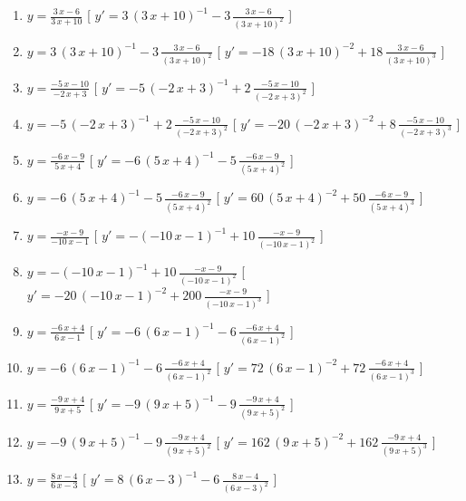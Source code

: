 \begin{esercizio}
\begin{enumerate}
\item $y= {\frac {3\,x-6}{3\,x+10}} $ \hfill [ $y'= 3\, \left( 3\,x+10 \right) ^{-1}-3\,{\frac {3\,x-6}{ \left( 3\,x+10 \right) ^{2}}}$ ]
\item $y= 3\, \left( 3\,x+10 \right) ^{-1}-3\,{\frac {3\,x-6}{ \left( 3\,x+10 \right) ^{2}}} $ \hfill [ $y'= -18\, \left( 3\,x+10 \right) ^{-2}+18\,{\frac {3\,x-6}{ \left( 3\,x+10 \right) ^{3}}}$ ]
\item $y= {\frac {-5\,x-10}{-2\,x+3}} $ \hfill [ $y'= -5\, \left( -2\,x+3 \right) ^{-1}+2\,{\frac {-5\,x-10}{ \left( -2\,x+3 \right) ^{2}}}$ ]
\item $y= -5\, \left( -2\,x+3 \right) ^{-1}+2\,{\frac {-5\,x-10}{ \left( -2\,x+3 \right) ^{2}}} $ \hfill [ $y'= -20\, \left( -2\,x+3 \right) ^{-2}+8\,{\frac {-5\,x-10}{ \left( -2\,x+3 \right) ^{3}}}$ ]
\item $y= {\frac {-6\,x-9}{5\,x+4}} $ \hfill [ $y'= -6\, \left( 5\,x+4 \right) ^{-1}-5\,{\frac {-6\,x-9}{ \left( 5\,x+4 \right) ^{2}}}$ ]
\item $y= -6\, \left( 5\,x+4 \right) ^{-1}-5\,{\frac {-6\,x-9}{ \left( 5\,x+4 \right) ^{2}}} $ \hfill [ $y'= 60\, \left( 5\,x+4 \right) ^{-2}+50\,{\frac {-6\,x-9}{ \left( 5\,x+4 \right) ^{3}}}$ ]
\item $y= {\frac {-x-9}{-10\,x-1}} $ \hfill [ $y'= - \left( -10\,x-1 \right) ^{-1}+10\,{\frac {-x-9}{ \left( -10\,x-1 \right) ^{2}}}$ ]
\item $y= - \left( -10\,x-1 \right) ^{-1}+10\,{\frac {-x-9}{ \left( -10\,x-1 \right) ^{2}}} $ \hfill [ $y'= -20\, \left( -10\,x-1 \right) ^{-2}+200\,{\frac {-x-9}{ \left( -10\,x-1 \right) ^{3}}}$ ]
\item $y= {\frac {-6\,x+4}{6\,x-1}} $ \hfill [ $y'= -6\, \left( 6\,x-1 \right) ^{-1}-6\,{\frac {-6\,x+4}{ \left( 6\,x-1 \right) ^{2}}}$ ]
\item $y= -6\, \left( 6\,x-1 \right) ^{-1}-6\,{\frac {-6\,x+4}{ \left( 6\,x-1 \right) ^{2}}} $ \hfill [ $y'= 72\, \left( 6\,x-1 \right) ^{-2}+72\,{\frac {-6\,x+4}{ \left( 6\,x-1 \right) ^{3}}}$ ]
\item $y= {\frac {-9\,x+4}{9\,x+5}} $ \hfill [ $y'= -9\, \left( 9\,x+5 \right) ^{-1}-9\,{\frac {-9\,x+4}{ \left( 9\,x+5 \right) ^{2}}}$ ]
\item $y= -9\, \left( 9\,x+5 \right) ^{-1}-9\,{\frac {-9\,x+4}{ \left( 9\,x+5 \right) ^{2}}} $ \hfill [ $y'= 162\, \left( 9\,x+5 \right) ^{-2}+162\,{\frac {-9\,x+4}{ \left( 9\,x+5 \right) ^{3}}}$ ]
\item $y= {\frac {8\,x-4}{6\,x-3}} $ \hfill [ $y'= 8\, \left( 6\,x-3 \right) ^{-1}-6\,{\frac {8\,x-4}{ \left( 6\,x-3 \right) ^{2}}}$ ]

\end{enumerate}
\end{esercizio}
